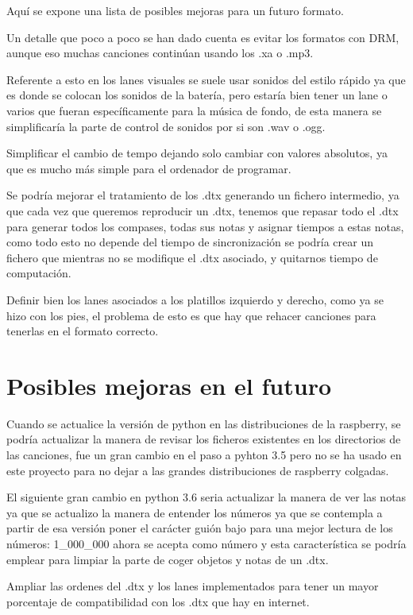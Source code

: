 \documentclass[a4paper,11pt,oneside]{book}
\begin{document}
Aquí se expone una lista de posibles mejoras para un futuro formato.

Un detalle que poco a poco se han dado cuenta es evitar los formatos con DRM, aunque eso muchas canciones continúan usando los .xa o .mp3.

Referente a esto en los lanes visuales se suele usar sonidos del estilo rápido ya que es donde se colocan los sonidos de la batería, pero estaría bien tener un lane o varios que fueran específicamente para la música de fondo, de esta manera se simplificaría la parte de control de sonidos por si son .wav o .ogg.

Simplificar el cambio de tempo dejando solo cambiar con valores absolutos, ya que es mucho más simple para el ordenador de programar.

Se podría mejorar el tratamiento de los .dtx generando un fichero intermedio, ya que cada vez que queremos reproducir un .dtx, tenemos que repasar todo el .dtx para generar todos los compases, todas sus notas y asignar tiempos a estas notas, como todo esto no depende del tiempo de sincronización se podría crear un fichero que mientras no se modifique el .dtx asociado, y quitarnos tiempo de computación.

Definir bien los lanes asociados a los platillos izquierdo y derecho, como ya se hizo con los pies, el problema de esto es que hay que rehacer canciones para tenerlas en el formato correcto.


\chapter{Posibles mejoras en el futuro}

Cuando se actualice la versión de python en las distribuciones de la raspberry, se podría actualizar la manera de revisar los ficheros existentes en los directorios de las canciones, fue un gran cambio en el paso a pyhton 3.5 pero no se ha usado en este proyecto para no dejar a las grandes distribuciones de raspberry colgadas.

El siguiente gran cambio en python 3.6 seria actualizar la manera de ver las notas ya que se actualizo la manera de entender los números ya que se contempla a partir de esa versión poner el carácter guión bajo para una mejor lectura de los números: 1\_000\_000 ahora se acepta como número y esta característica se podría emplear para limpiar la parte de coger objetos y notas de un .dtx.

Ampliar las ordenes del .dtx y los lanes implementados para tener un mayor porcentaje de compatibilidad con los .dtx que hay en internet.
\end{document}
